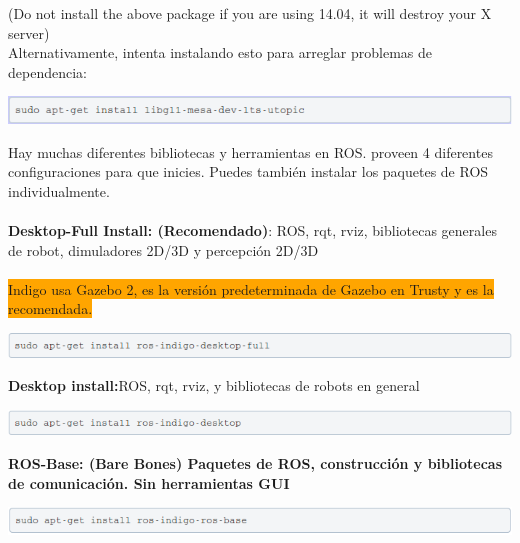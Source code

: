 \documentclass[a4paper]{book}
\begin{document}
(Do not install the above package if you are using 14.04, it will destroy your X server)\\
Alternativamente, intenta instalando esto para arreglar problemas de\\ dependencia: 

\begin{center}
\includegraphics[width=1.2\textwidth]{Figures/Software/Install_ROS/Paso_6.png}
\end{center}

Hay muchas diferentes bibliotecas y herramientas en ROS. proveen 4 diferentes configuraciones para que inicies. Puedes también instalar los paquetes de ROS individualmente.\\
\\
\textbf{Desktop-Full Install: (Recomendado)}: ROS, rqt, rviz, bibliotecas generales de robot, dimuladores 2D/3D y percepción 2D/3D\\
\\

\colorbox{orange}{Indigo usa Gazebo 2, es la versión predeterminada de Gazebo en Trusty y es la recomendada.}

\begin{center}
\includegraphics[width=1.2\textwidth]{Figures/Software/Install_ROS/Paso_7.png}
\end{center}

\textbf{Desktop install:}ROS, rqt, rviz, y bibliotecas de robots en general

\begin{center}
\includegraphics[width=1.2\textwidth]{Figures/Software/Install_ROS/Paso_8.png}
\end{center}

\textbf{ROS-Base: (Bare Bones) Paquetes de ROS, construcción y bibliotecas de comunicación. Sin herramientas GUI}

\begin{center}
\includegraphics[width=1.2\textwidth]{Figures/Software/Install_ROS/Paso_9.png}
\end{center}
\end{document}

